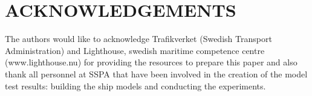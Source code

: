 \section*{ACKNOWLEDGEMENTS}\label{acknowledgements}
The authors would like to acknowledge Trafikverket (Swedish Transport
Administration) and Lighthouse, swedish maritime competence centre
(www.lighthouse.nu) for providing the resources to prepare this paper
and also thank all personnel at SSPA that have been involved in the
creation of the model test results: building the ship models and
conducting the experiments.
